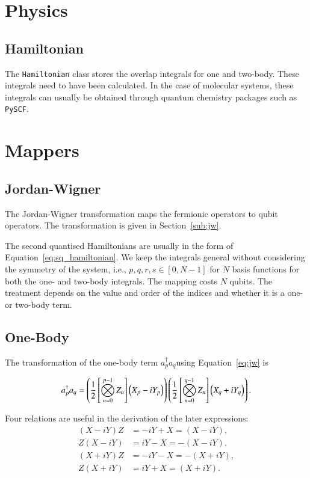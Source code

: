 \section{Physics}
\label{sec:physics}
\subsection{Hamiltonian}
The \texttt{Hamiltonian} class stores the overlap integrals for one and two-body. These integrals need to have been calculated. In the case of molecular systems, these integrals can usually be obtained through quantum chemistry packages such as \texttt{PySCF}\cite{sun2018}.

\section{Mappers}
\label{sec:mappers}
\subsection{Jordan-Wigner}
\label{sub:jordan-wigner-mapper}
The Jordan-Wigner transformation maps the fermionic operators to qubit operators. The transformation is given in Section~\ref{sub:jw}.

The second quantised Hamiltonians are usually in the form of Equation~\eqref{eq:sq_hamiltonian}. We keep the integrals general without considering the symmetry of the system, i.e., $ p,q,r,s \in [0, N-1] $ for $ N $ basis functions for both the one- and two-body integrals. The mapping costs $ N $ qubits. The treatment depends on the value and order of the indices and whether it is a one- or two-body term.
\subsection{One-Body}
\label{sub:one-body}
The transformation of the one-body term $ a_{p}^{\dagger}a_q $using Equation~\eqref{eq:jw} is

\begin{equation}
	\label{eq:ob_jw}
a_{p}^{\dagger}a_q \\
				   = \left( \frac{1}{2} \left[ \bigotimes_{n=0}^{p-1} Z_n \right] \left( X_p - i Y_p \right)   \right) 
 \left( \frac{1}{2} \left[ \bigotimes_{n=0}^{q-1} Z_n \right] \left( X_q +i Y_q \right)   \right).
\end{equation}

Four relations are useful in the derivation of the later expressions:
\begin{align}
	\label{eq:useful_relations}
	(X-iY)Z &= -iY+X = (X-iY), \\
	Z(X-iY) &= iY - X = -(X-iY), \\
	(X+iY)Z &= -iY -X = -(X+iY),\\
	Z(X+iY) &= iY + X = (X+iY).
\end{align}

